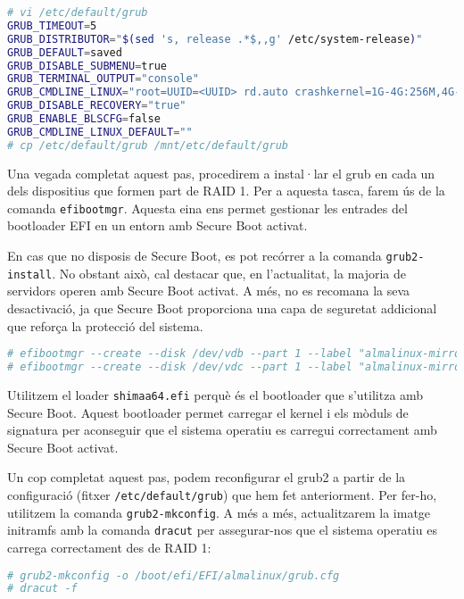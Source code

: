 \begin{lstlisting}[language=bash, numbers=none, commentstyle=\color{black}]
# vi /etc/default/grub
GRUB_TIMEOUT=5
GRUB_DISTRIBUTOR="$(sed 's, release .*$,,g' /etc/system-release)"
GRUB_DEFAULT=saved
GRUB_DISABLE_SUBMENU=true
GRUB_TERMINAL_OUTPUT="console"
GRUB_CMDLINE_LINUX="root=UUID=<UUID> rd.auto crashkernel=1G-4G:256M,4G-64G:320M,64G-:576M"
GRUB_DISABLE_RECOVERY="true"
GRUB_ENABLE_BLSCFG=false
GRUB_CMDLINE_LINUX_DEFAULT=""
# cp /etc/default/grub /mnt/etc/default/grub
\end{lstlisting}

Una vegada completat aquest pas, procedirem a instal·lar el grub en cada un dels dispositius que formen part de RAID 1. Per a aquesta tasca, farem ús de la comanda \texttt{efibootmgr}. Aquesta eina ens permet gestionar les entrades del bootloader EFI en un entorn amb Secure Boot activat.

En cas que no disposis de Secure Boot, es pot recórrer a la comanda \texttt{grub2-install}. No obstant això, cal destacar que, en l'actualitat, la majoria de servidors operen amb Secure Boot activat. A més, no es recomana la seva desactivació, ja que Secure Boot proporciona una capa de seguretat addicional que reforça la protecció del sistema.

\begin{lstlisting}[language=bash, numbers=none, commentstyle=\color{black}]
# efibootmgr --create --disk /dev/vdb --part 1 --label "almalinux-mirror-01" --loader "\EFI\almalinux\shimaa64.efi"
# efibootmgr --create --disk /dev/vdc --part 1 --label "almalinux-mirror-02" --loader "\EFI\almalinux\shimaa64.efi"
\end{lstlisting}

\begin{info}
Utilitzem el loader \texttt{shimaa64.efi} perquè és el bootloader que s'utilitza amb Secure Boot. Aquest bootloader permet carregar el kernel i els mòduls de signatura per aconseguir que el sistema operatiu es carregui correctament amb Secure Boot activat.
\end{info}

Un cop completat aquest pas, podem reconfigurar el grub2 a partir de la configuració (fitxer \texttt{/etc/default/grub}) que hem fet anteriorment. Per fer-ho, utilitzem la comanda \texttt{grub2-mkconfig}. A més a més, actualitzarem la imatge initramfs amb la comanda \texttt{dracut} per assegurar-nos que el sistema operatiu es carrega correctament des de RAID 1:

\begin{lstlisting}[language=bash, numbers=none, commentstyle=\color{black}]
# grub2-mkconfig -o /boot/efi/EFI/almalinux/grub.cfg
# dracut -f
\end{lstlisting}

